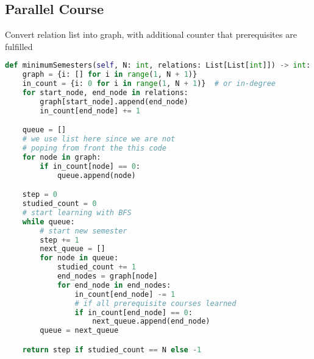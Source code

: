 \documentclass[english, threecolumn]{latex4ei/latex4ei_sheet}
\begin{document}
\begin{sectionbox}
\subsection{Parallel Course}
Convert relation list into graph, with additional counter that prerequisites are fulfilled

\begin{lstlisting}[language=python, gobble=0]
def minimumSemesters(self, N: int, relations: List[List[int]]) -> int:
    graph = {i: [] for i in range(1, N + 1)}
    in_count = {i: 0 for i in range(1, N + 1)}  # or in-degree
    for start_node, end_node in relations:
        graph[start_node].append(end_node)
        in_count[end_node] += 1

    queue = []
    # we use list here since we are not
    # poping from front the this code
    for node in graph:
        if in_count[node] == 0:
            queue.append(node)

    step = 0
    studied_count = 0
    # start learning with BFS
    while queue:
        # start new semester
        step += 1
        next_queue = []
        for node in queue:
            studied_count += 1
            end_nodes = graph[node]
            for end_node in end_nodes:
                in_count[end_node] -= 1
                # if all prerequisite courses learned
                if in_count[end_node] == 0:
                    next_queue.append(end_node)
        queue = next_queue

    return step if studied_count == N else -1
\end{lstlisting}
\end{sectionbox}
\end{document}
